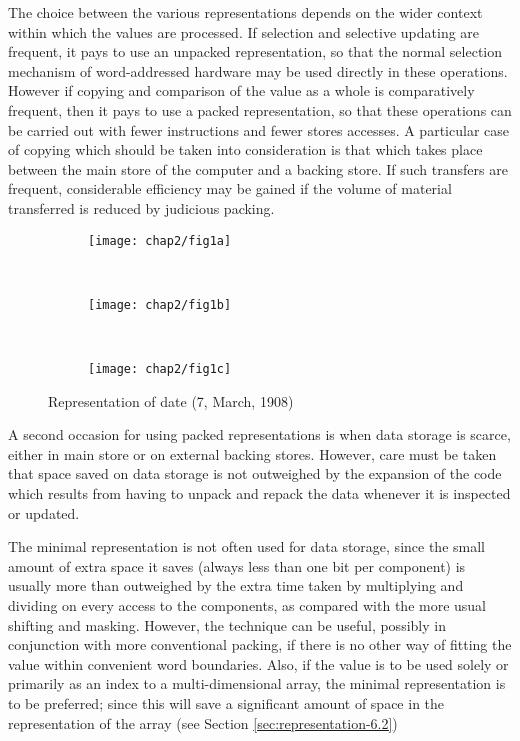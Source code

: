 The choice between the various representations depends on the wider context within which the values are processed. If selection and selective updating are frequent, it pays to use an unpacked representation, so that the normal selection mechanism of word-addressed hardware may be used directly in these operations. However if copying and comparison of the value as a whole is comparatively frequent, then it pays to use a packed representation, so that these operations can be carried out with fewer instructions and fewer stores accesses. A particular case of copying which should be taken into consideration is that which takes place between the main store of the computer and a backing store. If such transfers are frequent, considerable efficiency may be gained if the volume of material transferred is reduced by judicious packing.

\begin{figure}[th]
	\centering
	\begin{subfigure}[t]{0.3\textwidth}
		\centering
		\texttt{[image: chap2/fig1a]}
		\caption{}
	\end{subfigure}
	~
	\begin{subfigure}[t]{0.3\textwidth}
		\centering
		\texttt{[image: chap2/fig1b]}
		\caption{}
	\end{subfigure}
	~
	\begin{subfigure}[t]{0.3\textwidth}
		\centering
		\texttt{[image: chap2/fig1c]}
		\caption{}
	\end{subfigure}
	\caption{Representation of date (7, March, 1908)}
\end{figure}

A second occasion for using packed representations is when data storage is scarce, either in main store or on external backing stores. However, care must be taken that space saved on data storage is not outweighed by the expansion of the code which results from having to unpack and repack the data whenever it is inspected or updated.

The minimal representation is not often used for data storage, since the small amount of extra space it saves (always less than one bit per component) is usually more than outweighed by the extra time taken by multiplying and dividing on every access to the components, as compared with the more usual shifting and masking. However, the technique can be useful, possibly in conjunction with more conventional packing, if there is no other way of fitting the value within convenient word boundaries. Also, if the value is to be used solely or primarily as an index to a multi-dimensional array, the minimal representation is to be preferred; since this will save a significant amount of space in the representation of the array (see Section \ref{sec:representation-6.2})

